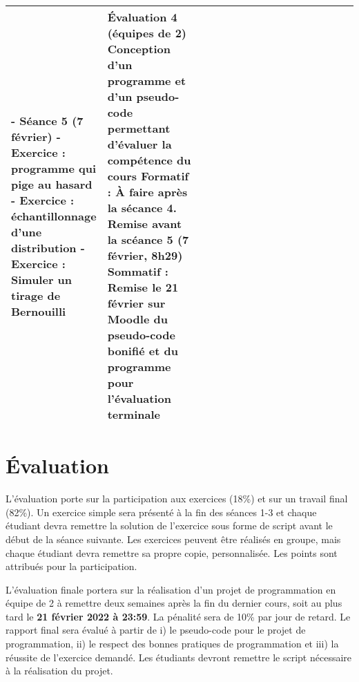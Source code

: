 \documentclass[12]{article}
\begin{document}
\begin{center}
\begin{tabular}{| p{0.1\linewidth} | p{0.3\linewidth} | p{0.3\linewidth} | p{0.3\linewidth} | }
        - \textbf{Séance 5} (7 février)\hfill\hfill \linebreak
        - Exercice : programme qui pige au hasard\hfill\hfill \linebreak
        - Exercice : échantillonnage d'une distribution\hfill\hfill \linebreak
        - Exercice : Simuler un tirage de Bernouilli\hfill\hfill &
        \textbf{Évaluation 4} (équipes de 2) \linebreak
        \textbf{Conception d'un programme et d'un pseudo-code permettant d’évaluer la compétence du cours}\hfill\hfill \linebreak\linebreak
        Formatif : À faire après la sécance 4. Remise avant la scéance 5 (7 février, 8h29)\hfill\hfill \linebreak\linebreak
        Sommatif : Remise le 21 février sur Moodle du pseudo-code bonifié et du programme pour l'évaluation terminale \hfill\hfill  \\
         \hline
         \hline
        \end{tabular}
        \end{center}

	\section*{Évaluation}

	L'évaluation porte sur la participation aux exercices (18\%) et sur un
	travail final (82\%). Un exercice simple sera présenté à la fin des
	séances 1-3 et chaque étudiant devra remettre la solution de l'exercice sous
	forme de script avant le début de la séance suivante. Les exercices
	peuvent être réalisés en groupe, mais chaque étudiant devra remettre sa
	propre copie, personnalisée. Les points sont attribués pour la
	participation.

	L'évaluation finale portera sur la réalisation d'un projet de
	programmation en équipe de 2 à remettre deux semaines après la fin du
	dernier cours, soit au plus tard le \textbf{21 février 2022 à 23:59}. La
	pénalité sera de 10\% par jour de retard. Le rapport final sera évalué à
	partir de i) le pseudo-code pour le projet de programmation, ii) le
	respect des bonnes pratiques de programmation et iii) la réussite de
	l'exercice demandé. Les étudiants devront remettre le script nécessaire à
	la réalisation du projet.
\end{document}
